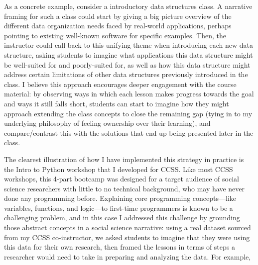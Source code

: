 \documentclass[11pt,letterpaper]{article}
\begin{document}
As a concrete example, consider a introductory data structures class.
A narrative framing for such a class could start by giving a big picture overview of the different data organization needs faced by real-world applications, perhaps pointing to existing well-known software for specific examples.
Then, the instructor could call back to this unifying theme when introducing each new data structure, asking students to imagine what applications this data structure might be well-suited for and poorly-suited for, as well as how this data structure might address certain limitations of other data structures previously introduced in the class.
I believe this approach encourages deeper engagement with the course material: by observing ways in which each lesson makes progress towards the goal and ways it still falls short, students can start to imagine how they might approach extending the class concepts to close the remaining gap (tying in to my underlying philosophy of feeling ownership over their learning), and compare/contrast this with the solutions that end up being presented later in the class.

The clearest illustration of how I have implemented this strategy in practice is the Intro to Python workshop that I developed for CCSS.
Like most CCSS workshops, this 4-part bootcamp was designed for a target audience of social science researchers with little to no technical background, who may have never done any programming before.
Explaining core programming concepts---like variables, functions, and logic---to first-time programmers is known to be a challenging problem, and in this case I addressed this challenge by grounding those abstract concepts in a social science narrative: using a real dataset sourced from my CCSS co-instructor, we asked students to imagine that they were using this data for their own research, then framed the lessons in terms of steps a researcher would need to take in preparing and analyzing the data.
For example, 
\end{document}
